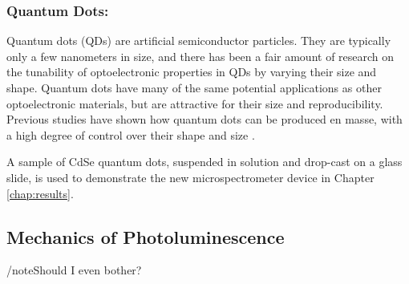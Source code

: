 \subsubsection{Quantum Dots: }

Quantum dots (QDs) are artificial semiconductor particles. They are typically only a few nanometers in size, and there has been a fair amount of research on the tunability of optoelectronic properties in QDs by varying their size and shape. Quantum dots have many of the same potential applications as other optoelectronic materials, but are attractive for their size and reproducibility. Previous studies have shown how quantum dots can be produced en masse, with a high degree of control over their shape and size \cite{empedocles_photoluminescence_1996, murray_synthesis_2000}.

A sample of CdSe quantum dots, suspended in solution and drop-cast on a glass slide, is used to demonstrate the new microspectrometer device in Chapter \ref{chap:results}.

\subsection{Mechanics of Photoluminescence}
/note{Should I even bother?}





